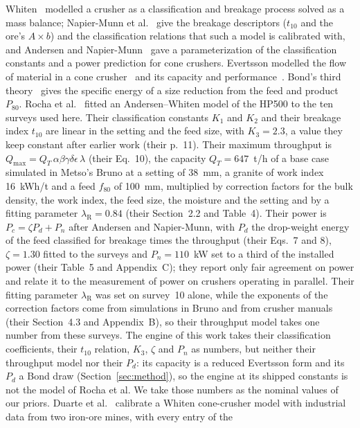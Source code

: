 \documentclass[journal]{IEEEtran}
\begin{document}
Whiten~\cite{whiten} modelled a crusher as a classification and breakage process solved as a mass balance; Napier-Munn et
al.~\cite{napier} give the breakage descriptors ($t_{10}$ and the ore's $A\times b$) and the classification relations that
such a model is calibrated with, and Andersen and Napier-Munn~\cite{andersen} gave a parameterization of the
classification constants and a power prediction for cone crushers. Evertsson modelled the flow of material in a cone
crusher~\cite{evertsson99} and its capacity and performance~\cite{evertsson}. Bond's third theory~\cite{bond} gives the
specific energy of a size reduction from the feed and product $P_{80}$. Rocha et al.~\cite{rocha} fitted an
Andersen--Whiten model of the HP500 to the ten surveys used here. Their classification constants $K_1$ and $K_2$ and their
breakage index $t_{10}$ are linear in the setting and the feed size, with $K_3=2.3$, a value they keep constant after earlier work (their p.~11). Their maximum
throughput is $Q_{\max}=Q_T\,\alpha\beta\gamma\delta\epsilon\,\lambda$ (their Eq.~10), the capacity $Q_T=647$~t/h of a base
case simulated in Metso's Bruno at a setting of 38~mm, a granite of work index 16~kWh/t and a feed $f_{80}$ of 100~mm,
multiplied by correction factors for the bulk density, the work index, the feed size, the moisture and the setting and by
a fitting parameter $\lambda_{\mathrm R}=0.84$ (their Section~2.2 and Table~4). Their power is $P_c=\zeta P_d+P_n$ after Andersen and
Napier-Munn, with $P_d$ the drop-weight energy of the feed classified for breakage times the throughput (their Eqs.~7 and
8), $\zeta=1.30$ fitted to the surveys and $P_n=110$~kW set to a third of the installed power (their Table~5 and
Appendix~C); they report only fair agreement on power and relate it to the
measurement of power on crushers operating in parallel. Their fitting parameter $\lambda_{\mathrm R}$ was set on survey~10
alone, while the exponents of the correction factors come from simulations in Bruno and from crusher manuals (their
Section~4.3 and Appendix~B), so their throughput model takes one number from these surveys. The engine of this work takes their classification coefficients,
their $t_{10}$ relation, $K_3$, $\zeta$ and $P_n$ as numbers, but neither their throughput model nor their $P_d$: its
capacity is a reduced Evertsson form and its $P_d$ a Bond draw (Section~\ref{sec:method}), so the engine at its shipped
constants is not the model of Rocha et al. We take those numbers as the nominal values of our priors. Duarte et
al.~\cite{duarte} calibrate a Whiten cone-crusher model with industrial data from two iron-ore mines, with every entry of the
\end{document}
